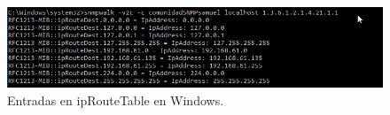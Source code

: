 
\FloatBarrier
\begin{figure}[htbp!]
		\centering
			\includegraphics[width=.9 \textwidth]{images/9-windows}
		\caption{Entradas en ipRouteTable en Windows.}
		\label{image:route-windows}
\end{figure}
\FloatBarrier



